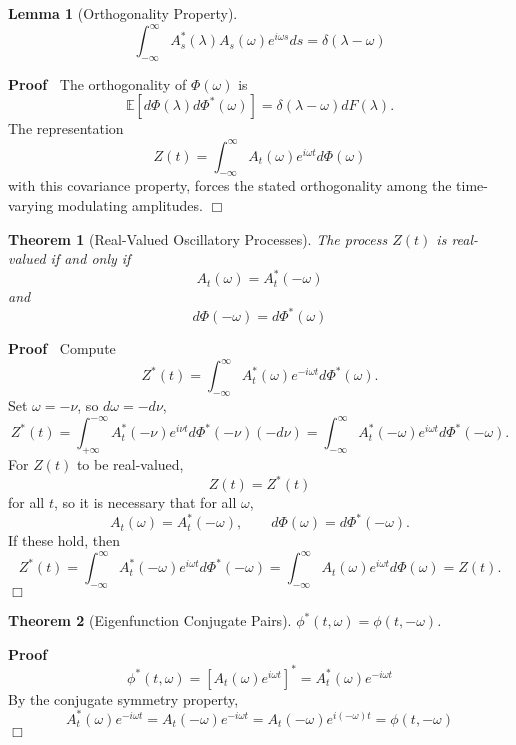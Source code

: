 \documentclass{article}
\newenvironment{proof}{\noindent\textbf{Proof\ }}{\hspace*{\fill}$\Box$\medskip}
\newtheorem{lemma}{Lemma}
\newtheorem{theorem}{Theorem}
\begin{document}
\begin{lemma}[Orthogonality Property]
  \[ \int_{- \infty}^{\infty} A_s^{\ast} (\lambda) A_s (\omega) e^{i \omega s}
     ds = \delta (\lambda - \omega) \]
\end{lemma}

\begin{proof}
  The orthogonality of $\Phi (\omega)$ is
  \[ \mathbb{E} [d \Phi (\lambda) d \Phi^{\ast} (\omega)] = \delta (\lambda -
     \omega) dF (\lambda) . \]
  The representation
  \[ Z (t) = \int_{- \infty}^{\infty} A_t (\omega) e^{i \omega t} d \Phi
     (\omega) \]
  with this covariance property, forces the stated orthogonality among the
  time-varying modulating amplitudes.
\end{proof}

\begin{theorem}[Real-Valued Oscillatory Processes]
  The process $Z (t)$ is real-valued if and only if
  \begin{equation}
    A_t (\omega) = A_t^{\ast}  (- \omega)
  \end{equation}
  and
  \begin{equation}
    d \Phi (- \omega) = d \Phi^{\ast} (\omega)
  \end{equation}
\end{theorem}

\begin{proof}
  Compute
  \[ Z^{\ast} (t) = \int_{- \infty}^{\infty} A_t^{\ast} (\omega) e^{- i \omega
     t} d \Phi^{\ast} (\omega) . \]
  Set $\omega = - \nu$, so $d \omega = - d \nu$,
  \[ Z^{\ast} (t) = \int_{+ \infty}^{- \infty} A_t^{\ast}  (- \nu) e^{i \nu t}
     d \Phi^{\ast}  (- \nu)  (- d \nu) = \int_{- \infty}^{\infty} A_t^{\ast} 
     (- \omega) e^{i \omega t} d \Phi^{\ast}  (- \omega) . \]
  For $Z (t)$ to be real-valued,
  \[ Z (t) = Z^{\ast} (t) \]
  for all $t$, so it is necessary that for all $\omega$,
  \[ A_t (\omega) = A_t^{\ast}  (- \omega), \qquad d \Phi (\omega) = d
     \Phi^{\ast}  (- \omega) . \]
  If these hold, then
  \[ Z^{\ast} (t) = \int_{- \infty}^{\infty} A_t^{\ast}  (- \omega) e^{i
     \omega t} d \Phi^{\ast}  (- \omega) = \int_{- \infty}^{\infty} A_t
     (\omega) e^{i \omega t} d \Phi (\omega) = Z (t) . \]
\end{proof}

\begin{theorem}[Eigenfunction Conjugate Pairs]
  $\phi^{\ast} (t, \omega) = \phi (t, - \omega)$.
\end{theorem}

\begin{proof}
  \[ \phi^{\ast} (t, \omega) = [A_t (\omega) e^{i \omega t}]^{\ast} =
     A_t^{\ast} (\omega) e^{- i \omega t} \]
  By the conjugate symmetry property,
  \[ A_t^{\ast} (\omega) e^{- i \omega t} = A_t  (- \omega) e^{- i \omega t} =
     A_t  (- \omega) e^{i (- \omega) t} = \phi (t, - \omega) \]
\end{proof}
\end{document}
